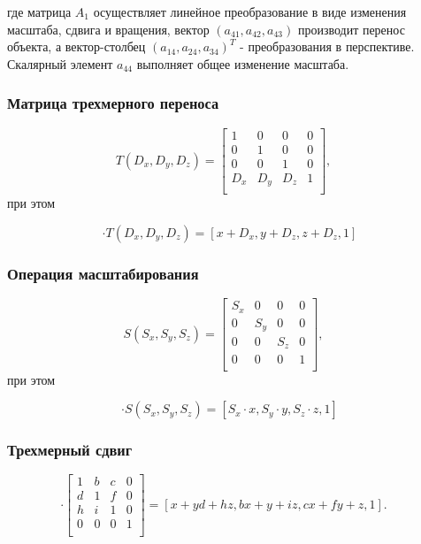 \documentclass[14pt, a4paper]{extarticle}
\begin{document}
	где матрица $A_1$ осуществляет линейное преобразование в виде изменения масштаба, сдвига и вращения,
	вектор $(a_{41},a_{42},a_{43})$ производит перенос объекта, а вектор-столбец $(a_{14},a_{24},a_{34})^T$ -
	преобразования в перспективе. Скалярный элемент $a_{44}$ выполняет общее изменение масштаба.
	
	\subsubsection{Матрица трехмерного переноса}
	$$
	T(D_x, D_y, D_z) = 
	\begin{bmatrix} 
		1 & 0 & 0 & 0 \\
		0 & 1 & 0 & 0 \\
		0 & 0 & 1 & 0 \\
		D_x & D_y & D_z & 1 \\
	\end{bmatrix},
	\quad
	$$
	при этом
	
	\begin{equation}
		[x, y, z, 1] \cdot T(D_x, D_y, D_z) =[x + D_x, y + D_z, z + D_z, 1]
	\end{equation}
		
	\subsubsection{Операция масштабирования}
	$$
	S(S_x, S_y, S_z) = 
	\begin{bmatrix} 
		S_x & 0 & 0 & 0 \\
		0 & S_y & 0 & 0 \\
		0 & 0 & S_z & 0 \\
		0 & 0 & 0 & 1 \\
	\end{bmatrix},
	\quad
	$$
	при этом
	
	\begin{equation}
		[x, y, z, 1] \cdot S(S_x, S_y, S_z) = [S_x \cdot x, S_y \cdot y, S_z \cdot z, 1]
	\end{equation}	
	
	
	\subsubsection{Трехмерный сдвиг}
	\begin{equation}
		[x, y, z, 1] \cdot 
		\begin{bmatrix} 
			1 & b & c & 0 \\
			d & 1 & f & 0 \\
			h & i & 1 & 0 \\
			0 & 0 & 0 & 1 \\
		\end{bmatrix} = [x + yd + hz, bx + y + iz, cx + fy + z, 1].
		\quad
	\end{equation}	
			
\end{document}
